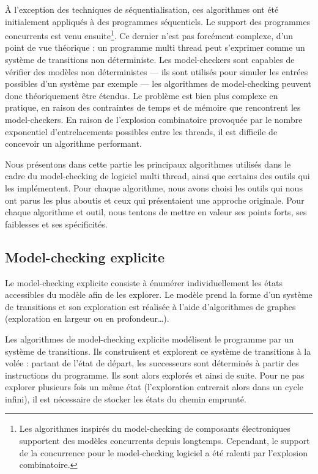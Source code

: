 À l'exception des techniques de séquentialisation, ces algorithmes ont été
initialement appliqués à des programmes séquentiels. Le support des programmes
concurrents est venu ensuite\footnote{Les algorithmes inspirés du model-checking
  de composants électroniques supportent des modèles concurrents depuis
  longtemps. Cependant, le support de la concurrence pour le model-checking
  logiciel a été ralenti par l'explosion combinatoire.}.
Ce dernier n'est pas forcément complexe, d'un point de vue théorique : un
programme multi thread peut s'exprimer comme un système de transitions
non déterministe. Les model-checkers sont capables de vérifier des modèles
non déterministes --- ils sont utilisés pour simuler les entrées possibles d'un
système par exemple --- les algorithmes de model-checking peuvent donc
théoriquement être étendus.
Le problème est bien plus complexe en pratique, en raison des contraintes de
temps et de mémoire que rencontrent les model-checkers. En raison de l'explosion
combinatoire provoquée par le nombre exponentiel d'entrelacements possibles
entre les threads, il est difficile de concevoir un algorithme performant.

Nous présentons dans cette partie les principaux algorithmes utilisés dans le
cadre du model-checking de logiciel multi thread, ainsi que certains des outils
qui les implémentent. Pour chaque algorithme, nous avons choisi les outils qui
nous ont parus les plus aboutis et ceux qui présentaient une approche originale.
Pour chaque algorithme et outil, nous tentons de mettre en valeur ses points
forts, ses faiblesses et ses spécificités.

\subsection{Model-checking explicite}

Le model-checking explicite consiste à énumérer individuellement les
états accessibles du modèle afin de les explorer. Le modèle prend la
forme d'un système de transitions et son exploration est réalisée à
l'aide d'algorithmes de graphes (exploration en largeur ou en
profondeur\dots).

Les algorithmes de model-checking explicite modélisent le programme par un
système de transitions. Ils construisent et explorent ce système de transitions
à la volée : partant de l'état de départ, les successeurs sont déterminés à
partir des instructions du programme. Ils sont alors explorés et ainsi de suite.
Pour ne pas explorer plusieurs fois un même état (l'exploration entrerait alors
dans un cycle infini), il est nécessaire de stocker les états du chemin
emprunté.

